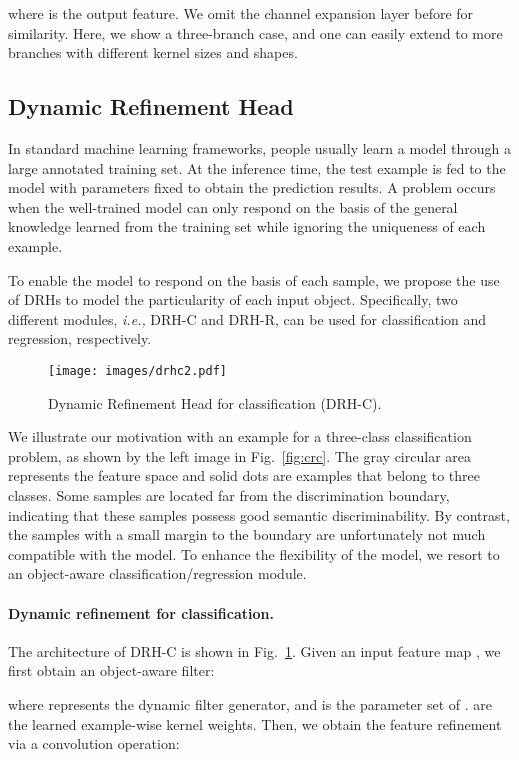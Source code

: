 \documentclass[10pt,twocolumn,letterpaper]{article}
\begin{document}
where    is the output feature.  We omit the channel expansion layer before  for similarity.
Here, we show a three-branch case, and one can easily extend to more branches with different kernel sizes and shapes.

\subsection{Dynamic Refinement Head}
\label{sec:drh}
In standard machine learning frameworks, people usually learn a model through a large annotated training set.
At the inference time, the test example is fed to the model with parameters fixed to obtain the prediction results.
A problem occurs when the well-trained model can only respond on the basis of the general knowledge learned from the training set while ignoring the uniqueness of each example.

To enable the model to respond on the basis of each sample, we propose the use of DRHs to model the particularity of each input object. Specifically, two different modules, \emph{i.e.,} DRH-C and DRH-R, can be used for classification and regression, respectively.

\begin{figure}\centering
\texttt{[image: images/drhc2.pdf]}
\caption{Dynamic Refinement Head for classification (DRH-C).}
\label{fig:dfmc}
\end{figure} 
We illustrate our motivation with an example for a three-class classification problem, as shown by the left image in Fig.~\ref{fig:crc}. The gray circular area represents the feature space and solid dots are examples that belong to three classes. Some samples are located far from the discrimination boundary, indicating that these samples possess good semantic discriminability. By contrast, the samples with a small margin to the boundary are unfortunately not much compatible with the model. To enhance the flexibility of the model, we resort to an object-aware classification/regression module.

\paragraph{Dynamic refinement for classification.}
The architecture of DRH-C is shown in Fig.~\ref{fig:dfmc}.
Given an input feature map   , we first obtain an object-aware filter:

where  represents the dynamic filter generator, and  is the parameter set of .  are the learned example-wise kernel weights.
Then, we obtain the feature refinement  via a convolution operation:
\end{document}
